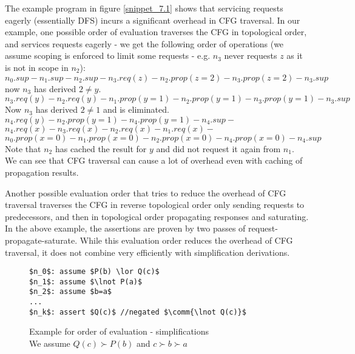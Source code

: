 The example program in figure \ref{snippet_7.1} shows that servicing requests eagerly (essentially DFS) incurs a significant overhead in CFG traversal. In our example, one possible order of evaluation traverses the CFG in topological order, and services requests eagerly - we get the following order of operations (we assume scoping is enforced to limit some requests - e.g. $n_3$ never requests $z$ as it is not in scope in $n_2$):\\
$n_0.sup - n_1.sup - n_2.sup - n_3.req(z) - n_2.prop(z=2) - n_3.prop(z=2) - n_3.sup$ now $n_3$ has derived $2\neq y$.\\
$n_3.req(y) - n_2.req(y) - n_1.prop(y=1) - n_2.prop(y=1) - n_3.prop(y=1) - n_3.sup$ Now $n_3$ has derived $2\neq 1$ and is eliminated.\\
$n_4.req(y) - n_2.prop(y=1) - n_4.prop(y=1) - n_4.sup - $\\
$n_4.req(x) - n_3.req(x) - n_2.req(x) - n_1.req(x) - $\\
$n_0.prop(x=0) - n_1.prop(x=0) - n_2.prop(x=0) - n_4.prop(x=0) - n_4.sup$\\
Note that $n_2$ has cached the result for $y$ and did not request it again from $n_1$.\\
We can see that CFG traversal can cause a lot of overhead even with caching of propagation results.

Another possible evaluation order that tries to reduce the overhead of CFG traversal traverses the CFG in reverse topological order only sending requests to predecessors, and then in topological order propagating responses and saturating. In the above example, the assertions are proven by two passes of request-propagate-saturate. 
While this evaluation order reduces the overhead of CFG traversal, it does not combine very efficiently with simplification derivations.

\begin{figure}
\begin{lstlisting}
$n_0$: assume $P(b) \lor Q(c)$
$n_1$: assume $\lnot P(a)$
$n_2$: assume $b=a$
...
$n_k$: assert $Q(c)$ //negated $\comm{\lnot Q(c)}$
\end{lstlisting}
\caption{Example for order of evaluation - simplifications\\
We assume $Q(c)\succ P(b)$ and $c\succ b \succ a$}
\label{snippet_7.2}
\end{figure}

